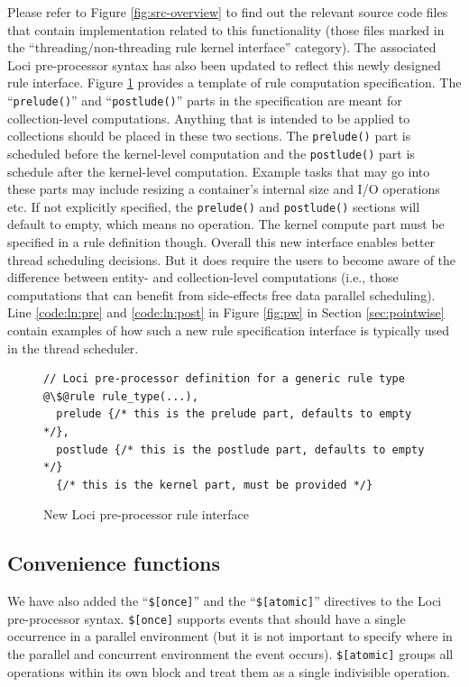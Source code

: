 \documentclass{article}
\begin{document}
Please refer to Figure \ref{fig:src-overview} to find out the relevant
source code files that contain implementation related to this
functionality (those files marked in the ``threading/non-threading rule
kernel interface'' category).  The associated Loci pre-processor syntax
has also been updated to reflect this newly designed rule interface.
Figure \ref{fig:pp-rule} provides a template of rule computation
specification.  The ``\texttt{prelude()}'' and ``\texttt{postlude()}''
parts in the specification are meant for collection-level computations.
Anything that is intended to be applied to collections should be placed
in these two sections.  The \texttt{prelude()} part is scheduled before
the kernel-level computation and the \texttt{postlude()} part is schedule
after the kernel-level computation.  Example tasks that may go into
these parts may include resizing a container's internal size and I/O
operations etc.  If not explicitly specified, the \texttt{prelude()} and
\texttt{postlude()} sections will default to empty, which means no
operation.  The kernel compute part must be specified in a rule
definition though.  Overall this new interface enables better thread
scheduling decisions.  But it does require the users to become aware of
the difference between entity- and collection-level computations (i.e.,
those computations that can benefit from side-effects free data parallel
scheduling).  Line \ref{code:ln:pre} and \ref{code:ln:post} in Figure
\ref{fig:pw} in Section \ref{sec:pointwise} contain examples of how such
a new rule specification interface is typically used in the thread
scheduler.

\begin{figure}[h]
\begin{lstlisting}[escapechar=@]
// Loci pre-processor definition for a generic rule type
@\$@rule rule_type(...),
  prelude {/* this is the prelude part, defaults to empty */},
  postlude {/* this is the postlude part, defaults to empty */}
  {/* this is the kernel part, must be provided */}
\end{lstlisting}
\caption{New Loci pre-processor rule interface\label{fig:pp-rule}}
\end{figure}

\subsection{Convenience functions}
We have also added the ``\texttt{\$[once]}'' and the
``\texttt{\$[atomic]}'' directives to the Loci pre-processor syntax.
\texttt{\$[once]} supports events that should have a single occurrence
in a parallel environment (but it is not important to specify where in
the parallel and concurrent environment the event occurs).
\texttt{\$[atomic]} groups all operations within its own block and treat
them as a single indivisible operation.
\end{document}
